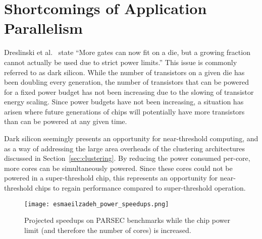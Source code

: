 \section{Shortcomings of Application Parallelism} \label{sec:darksilicon}

Dreslinski et al.~\cite{Dreslinski:2010ez} state ``More gates can now fit on a die, but a growing fraction cannot actually be used due to strict power limits.''
This issue is commonly referred to as dark silicon.
While the number of transistors on a given die has been doubling every generation, the number of transistors that can be powered for a fixed power budget has not been increasing due to the slowing of transistor energy scaling.
Since power budgets have not been increasing, a situation has arisen where future generations of chips will potentially have more transistors than can be powered at any given time.

Dark silicon seemingly presents an opportunity for near-threshold computing, and as a way of addressing the large area overheads of the clustering architectures discussed in Section~\ref{sec:clustering}.
By reducing the power consumed per-core, more cores can be simultaneously powered.
Since these cores could not be powered in a super-threshold chip, this represents an opportunity for near-threshold chips to regain performance compared to super-threshold operation.

\begin{figure}[thpb] \centering
\texttt{[image: esmaeilzadeh\_power\_speedups.png]}
\caption{Projected speedups on PARSEC benchmarks while the chip power limit (and therefore the number of cores) is increased.~\cite{Esmaeilzadeh2011Dark-silicon-an}}
\label{fig:power_speedups}
\end{figure}

